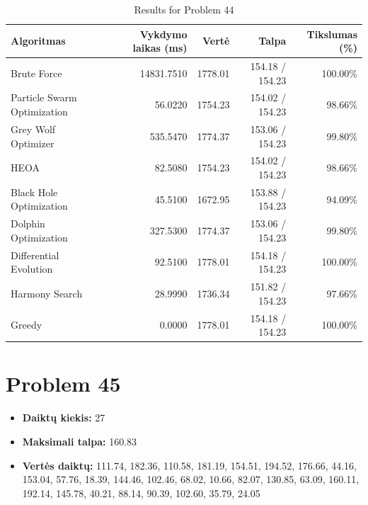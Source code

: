 \documentclass[a4paper,11pt]{article}
\begin{document}
\begin{table}[h!]
\centering
\begin{tabular}{lrrrr}
\toprule
\textbf{Algoritmas} & \textbf{Vykdymo laikas (ms)} & \textbf{Vertė} & \textbf{Talpa} & \textbf{Tikslumas (\%)} \\
\midrule
Brute Force & 14831.7510 & 1778.01 & 154.18 / 154.23 & 100.00\% \\
Particle Swarm Optimization & 56.0220 & 1754.23 & 154.02 / 154.23 & 98.66\% \\
Grey Wolf Optimizer & 535.5470 & 1774.37 & 153.06 / 154.23 & 99.80\% \\
HEOA & 82.5080 & 1754.23 & 154.02 / 154.23 & 98.66\% \\
Black Hole Optimization & 45.5100 & 1672.95 & 153.88 / 154.23 & 94.09\% \\
Dolphin Optimization & 327.5300 & 1774.37 & 153.06 / 154.23 & 99.80\% \\
Differential Evolution & 92.5100 & 1778.01 & 154.18 / 154.23 & 100.00\% \\
Harmony Search & 28.9990 & 1736.34 & 151.82 / 154.23 & 97.66\% \\
Greedy & 0.0000 & 1778.01 & 154.18 / 154.23 & 100.00\% \\
\bottomrule
\end{tabular}
\caption{Results for Problem 44}
\end{table}
\clearpage

\section*{Problem 45}
\begin{itemize}
    \item \textbf{Daiktų kiekis:} 27
    \item \textbf{Maksimali talpa:} 160.83
    \item \textbf{Vertės daiktų:} 111.74, 182.36, 110.58, 181.19, 154.51, 194.52, 176.66, 44.16, 153.04, 57.76, 18.39, 144.46, 102.46, 68.02, 10.66, 82.07, 130.85, 63.09, 160.11, 192.14, 145.78, 40.21, 88.14, 90.39, 102.60, 35.79, 24.05
\end{itemize}
\end{document}
